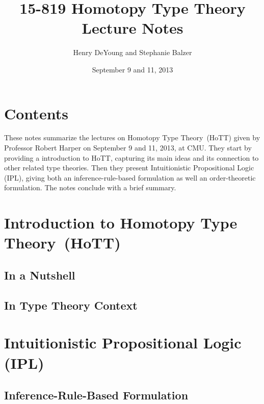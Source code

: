 \documentclass[11pt]{article}
\newcommand{\HoTT}{Homotopy Type Theory}
\begin{document}
\title{15-819 Homotopy Type Theory\\ Lecture Notes}
\author{Henry DeYoung and Stephanie Balzer}
\date{September 9 and 11, 2013}

\maketitle

\section{Contents}\label{sec:contents}

These notes summarize the lectures on \HoTT\ (HoTT) given by Professor Robert Harper on
September 9 and 11, 2013, at CMU.  They start by providing a introduction to HoTT, capturing
its main ideas and its connection to other related type theories.  Then they present
Intuitionistic Propositional Logic (IPL), giving both an inference-rule-based formulation as
well an order-theoretic formulation.  The notes conclude with a brief summary.


\section{Introduction to \HoTT\ (HoTT)}\label{sec:intro}

\subsection{In a Nutshell}\label{subsec:hott_in_nutshell}

\subsection{In Type Theory Context}\label{subsec:type_theory_context}

\section{Intuitionistic Propositional Logic (IPL)}\label{sec:ipl}

\subsection{Inference-Rule-Based Formulation}\label{subsec:ipl_rules}

\end{document}
